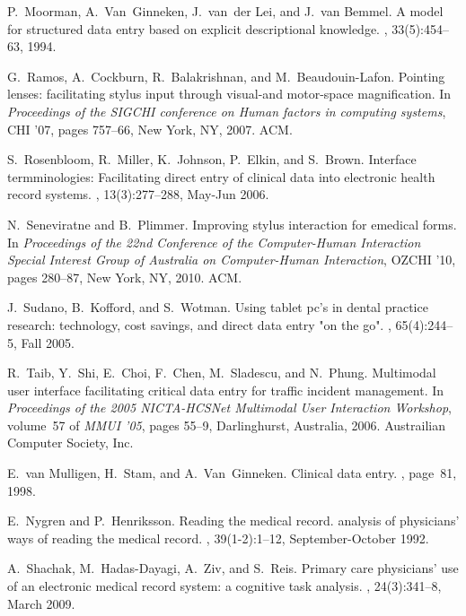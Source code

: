 \documentclass[11pt]{article}
\begin{document}
\begin{thebibliography}{9}
P.~Moorman, A.~Van~Ginneken, J.~van~der Lei, and J.~van Bemmel.
\newblock A model for structured data entry based on explicit descriptional
  knowledge.
, 33(5):454--63, 1994.

G.~Ramos, A.~Cockburn, R.~Balakrishnan, and M.~Beaudouin-Lafon.
\newblock Pointing lenses: facilitating stylus input through visual-and
  motor-space magnification.
\newblock In {\em Proceedings of the SIGCHI conference on Human factors in
  computing systems}, CHI '07, pages 757--66, New York, NY, 2007. ACM.

S.~Rosenbloom, R.~Miller, K.~Johnson, P.~Elkin, and S.~Brown.
\newblock Interface termminologies: Facilitating direct entry of clinical data
  into electronic health record systems.
, 13(3):277--288, May-Jun 2006.

N.~Seneviratne and B.~Plimmer.
\newblock Improving stylus interaction for emedical forms.
\newblock In {\em Proceedings of the 22nd Conference of the Computer-Human
  Interaction Special Interest Group of Australia on Computer-Human
  Interaction}, OZCHI '10, pages 280--87, New York, NY, 2010. ACM.

J.~Sudano, B.~Kofford, and S.~Wotman.
\newblock Using tablet pc's in dental practice research: technology, cost
  savings, and direct data entry "on the go".
, 65(4):244--5, Fall 2005.

R.~Taib, Y.~Shi, E.~Choi, F.~Chen, M.~Sladescu, and N.~Phung.
\newblock Multimodal user interface facilitating critical data entry for
  traffic incident management.
\newblock In {\em Proceedings of the 2005 NICTA-HCSNet Multimodal User
  Interaction Workshop}, volume~57 of {\em MMUI '05}, pages 55--9,
  Darlinghurst, Australia, 2006. Austrailian Computer Society, Inc.

E.~van Mulligen, H.~Stam, and A.~Van~Ginneken.
\newblock Clinical data entry.
, page~81, 1998.

E.~Nygren and P.~Henriksson.
\newblock Reading the medical record. analysis of physicians' ways of reading
  the medical record.
, 39(1-2):1--12,
  September-October 1992.

A.~Shachak, M.~Hadas-Dayagi, A.~Ziv, and S.~Reis.
\newblock Primary care physicians' use of an electronic medical record system:
  a cognitive task analysis.
, 24(3):341--8, March 2009.



\end{thebibliography}
\end{document}
